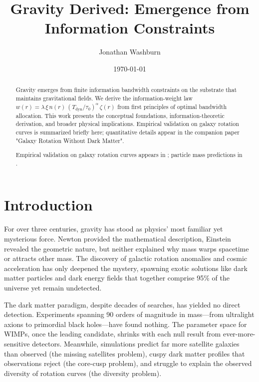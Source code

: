 \documentclass[twocolumn,prd,amsmath,amssymb,aps,superscriptaddress,nofootinbib]{revtex4-2}
\begin{document}
\title{Gravity Derived: Emergence from Information Constraints}

\author{Jonathan Washburn}

\date{\today}

\begin{abstract}
\noindent
Gravity emerges from finite information bandwidth constraints on the substrate that maintains gravitational fields.  We derive the information-weight law $w(r)=\lambda\,\xi\,n(r)\,(T_{\text{dyn}}/\tau_0)^\alpha\,\zeta(r)$ from first principles of optimal bandwidth allocation.  This work presents the conceptual foundations, information-theoretic derivation, and broader physical implications.  Empirical validation on galaxy rotation curves is summarized briefly here; quantitative details appear in the companion paper "Galaxy Rotation Without Dark Matter".

Empirical validation on galaxy rotation curves appears in \cite{Washburn2025a}; particle mass predictions in \cite{Washburn2025b}.
\end{abstract}

\maketitle

\section{Introduction}

For over three centuries, gravity has stood as physics' most familiar yet mysterious force. Newton provided the mathematical description, Einstein revealed the geometric nature, but neither explained why mass warps spacetime or attracts other mass. The discovery of galactic rotation anomalies \cite{Rubin1970} and cosmic acceleration \cite{Riess1998} has only deepened the mystery, spawning exotic solutions like dark matter particles and dark energy fields that together comprise 95\% of the universe yet remain undetected.

The dark matter paradigm, despite decades of searches, has yielded no direct detection. Experiments spanning 90 orders of magnitude in mass---from ultralight axions to primordial black holes---have found nothing. The parameter space for WIMPs, once the leading candidate, shrinks with each null result from ever-more-sensitive detectors. Meanwhile, simulations predict far more satellite galaxies than observed (the missing satellites problem), cuspy dark matter profiles that observations reject (the core-cusp problem), and struggle to explain the observed diversity of rotation curves (the diversity problem).
\end{document}
